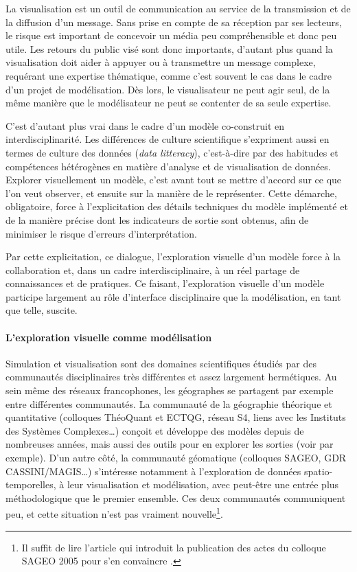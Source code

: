 \noindent La visualisation est un outil de communication au service de la transmission et de la diffusion d’un message.
Sans prise en compte de sa réception par ses lecteurs, le risque est important de concevoir un média peu compréhensible et donc peu utile.
Les retours du public visé sont donc importants, d’autant plus quand la visualisation doit aider à appuyer ou à transmettre un message complexe, requérant une expertise thématique, comme c’est souvent le cas dans le cadre d’un projet de modélisation.
Dès lors, le visualisateur ne peut agir seul, de la même manière que le modélisateur ne peut se contenter de sa seule expertise.

\noindent C'est d'autant plus vrai dans le cadre d'un modèle co-construit en interdisciplinarité.
Les différences de culture scientifique s'expriment aussi en termes de \og culture des données\fg{} (\textit{data litteracy}), c'est-à-dire par des habitudes et compétences hétérogènes en matière d'analyse et de visualisation de données.
Explorer visuellement un modèle, c'est avant tout se mettre d'accord sur ce que l'on veut observer, et ensuite sur la manière de le représenter.
Cette démarche, obligatoire, force à l'explicitation des détails techniques du modèle implémenté et de la manière précise dont les indicateurs de sortie sont obtenus, afin de minimiser le risque d'erreurs d'interprétation.

\noindent Par cette explicitation, ce dialogue, l'exploration visuelle d'un modèle force à la collaboration et, dans un cadre interdisciplinaire, à un réel partage de connaissances et de pratiques.
Ce faisant, l'exploration visuelle d'un modèle participe largement au rôle d'interface disciplinaire que la modélisation, en tant que telle, suscite.


\paragraph{L'exploration visuelle comme modélisation}
Simulation et visualisation sont des domaines scientifiques étudiés par des communautés disciplinaires très différentes et assez largement hermétiques.
Au sein même des réseaux francophones, les géographes se partagent par exemple entre différentes communautés.
La communauté de la géographie théorique et quantitative (colloques ThéoQuant et ECTQG, réseau S4, liens avec les Instituts des Systèmes Complexes\ldots) conçoit et développe des modèles depuis de nombreuses années, mais aussi des outils pour en explorer les sorties (voir \textcite{tannier:halshs-01003259} par exemple).
D'un autre côté, la communauté géomatique (colloques SAGEO, GDR CASSINI/MAGIS\ldots) s'intéresse notamment à l'exploration de données spatio-temporelles, à leur visualisation et modélisation, avec peut-être une entrée plus méthodologique que le premier ensemble.
Ces deux communautés communiquent peu, et cette situation n'est pas vraiment nouvelle\footnote{
	Il suffit de lire l'article qui introduit la publication des actes du colloque SAGEO 2005 pour s'en convaincre \autocite{josselin_presentation_2006}.
}.

